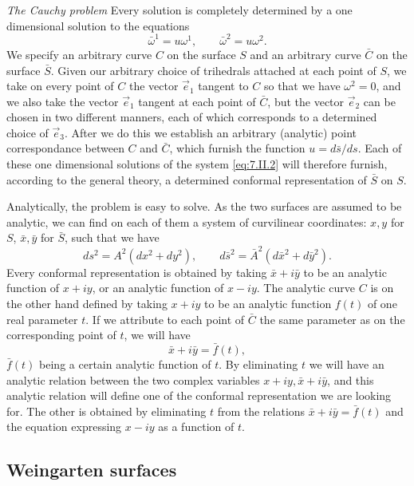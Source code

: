 \documentclass[leqno,11pt]{book}
\numberwithin{equation}{chapter}
\theoremstyle{shape1}
\theoremstyle{shape0}
\theoremstyle{shape2}
\theoremstyle{definition}
\begin{document}
\vspace{12pt}\fsec\emph{The Cauchy problem} Every solution is completely determined by a one dimensional solution to the equations
\begin{equation}
  \tag{II, 1}
  \bar\omega^{1}=u\omega^{1},\qquad\bar\omega^{2}=u\omega^{2}.
\end{equation}
We specify an arbitrary curve $C$ on the surface $S$ and an arbitrary curve $\bar C$ on the surface $\bar S$. Given our arbitrary choice of trihedrals attached at each point of $S$, we take on every point of $C$ the vector $\vec e_{1}$ tangent to $C$ so that we have $\omega^{2}=0$, and we also take the vector $\vec e_{1}$ tangent at each point of $\bar C$, but the vector $\vec e_{2}$ can be chosen in two different manners, each of which corresponds to a determined choice of $\vec e_{3}$. After we do this we establish an arbitrary (analytic) point correspondance between $C$ and $\bar C$, which furnish the function $u=d\bar s/ds$. Each of these one dimensional solutions of the system \eqref{eq:7.II.2} will therefore furnish, according to the general theory, a determined conformal representation of $\bar S$ on $S$.

Analytically, the problem is easy to solve. As the two surfaces are assumed to be analytic, we can find on each of them a system of curvilinear coordinates: $x,y$ for $S$, $\bar x,\bar y$ for $\bar S$,  such that we have
\[
ds^{2}=A^{2}(dx^{2}+dy^{2}),\qquad d\bar s^{2}=\bar A^{2}(d\bar x^{2}+d\bar y^{2}).
\]
Every conformal representation is obtained by taking $\bar x+i\bar y$ to be an analytic function of $x+iy$, or an analytic function of $x-iy$. The analytic curve $C$ is on the other hand defined by taking $x+iy$ to be an analytic function $f(t)$ of one real parameter $t$. If we attribute to each point of $\bar C$ the same parameter as on the corresponding point of $t$, we will have
\[
\bar x+i\bar y=\bar f(t),
\]
$\bar f(t)$ being a certain analytic function of $t$. By eliminating $t$ we will have an analytic relation between the two complex variables $x+iy, \bar x+i\bar y$, and this analytic relation will define one of the conformal representation we are looking for. The other is obtained by eliminating $t$ from the relations $\bar x+i\bar y=\bar f(t)$ and the equation expressing $x-iy$ as a function of $t$.





\subsection{Weingarten surfaces}
\label{sec:weingarten-surfaces}
\end{document}
